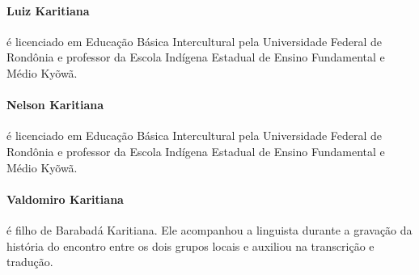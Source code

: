 \paragraph{Luiz Karitiana} é licenciado em Educação Básica Intercultural pela
Universidade Federal de Rondônia e professor da Escola Indígena Estadual
de Ensino Fundamental e Médio Kyõwã.

\paragraph{Nelson Karitiana} é licenciado em Educação Básica Intercultural pela
Universidade Federal de Rondônia e professor da Escola Indígena Estadual
de Ensino Fundamental e Médio Kyõwã.

\paragraph{Valdomiro Karitiana} é filho de Barabadá Karitiana. Ele acompanhou a
linguista durante a gravação da história do encontro entre os dois
grupos locais e auxiliou na transcrição e tradução.

\begin{comment}
(Quarta-capa)

Então ele (Moraes) morreu, a doença do branco o matou

Então meu finado pai se juntou

Quando o Moraes morreu, nós ficamos juntos

Nunca mais nos separamos

Assim nós ficamos, assim

Não havia mais homens quando ele morreu

Os homens ficaram com o meu pai

O meu finado pai trouxe todos para cá

Então o meu pai morreu aqui

Então eles não foram mais na aldeia deles

Aqui meu finado pai morreu

Assim o pessoal ficou junto

Não existe mais o que contar, esse é o final
\end{comment}


